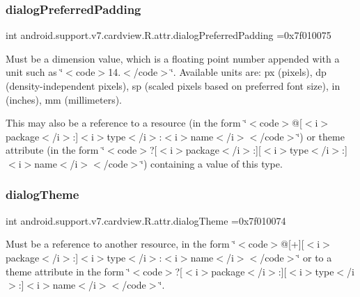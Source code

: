 \subsubsection{\texorpdfstring{dialog\+Preferred\+Padding}{dialogPreferredPadding}}
{\footnotesize\ttfamily int android.\+support.\+v7.\+cardview.\+R.\+attr.\+dialog\+Preferred\+Padding =0x7f010075\hspace{0.3cm}{\ttfamily [static]}}

Must be a dimension value, which is a floating point number appended with a unit such as \char`\"{}$<$code$>$14.\+5sp$<$/code$>$\char`\"{}. Available units are\+: px (pixels), dp (density-\/independent pixels), sp (scaled pixels based on preferred font size), in (inches), mm (millimeters). 

This may also be a reference to a resource (in the form \char`\"{}$<$code$>$@\mbox{[}$<$i$>$package$<$/i$>$\+:\mbox{]}$<$i$>$type$<$/i$>$\+:$<$i$>$name$<$/i$>$$<$/code$>$\char`\"{}) or theme attribute (in the form \char`\"{}$<$code$>$?\mbox{[}$<$i$>$package$<$/i$>$\+:\mbox{]}\mbox{[}$<$i$>$type$<$/i$>$\+:\mbox{]}$<$i$>$name$<$/i$>$$<$/code$>$\char`\"{}) containing a value of this type. \mbox{\label{classandroid_1_1support_1_1v7_1_1cardview_1_1R_1_1attr_a73935a8052ea75bfe3670af44157de18}} 
\subsubsection{\texorpdfstring{dialog\+Theme}{dialogTheme}}
{\footnotesize\ttfamily int android.\+support.\+v7.\+cardview.\+R.\+attr.\+dialog\+Theme =0x7f010074\hspace{0.3cm}{\ttfamily [static]}}

Must be a reference to another resource, in the form \char`\"{}$<$code$>$@\mbox{[}+\mbox{]}\mbox{[}$<$i$>$package$<$/i$>$\+:\mbox{]}$<$i$>$type$<$/i$>$\+:$<$i$>$name$<$/i$>$$<$/code$>$\char`\"{} or to a theme attribute in the form \char`\"{}$<$code$>$?\mbox{[}$<$i$>$package$<$/i$>$\+:\mbox{]}\mbox{[}$<$i$>$type$<$/i$>$\+:\mbox{]}$<$i$>$name$<$/i$>$$<$/code$>$\char`\"{}. \mbox{\label{classandroid_1_1support_1_1v7_1_1cardview_1_1R_1_1attr_a95f87179f6c66822d84023d578c161b2}} 
